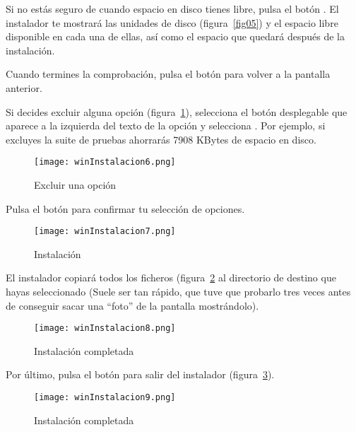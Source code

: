 Si no estás seguro de cuando espacio en disco tienes libre, pulsa el botón . El instalador te mostrará las unidades de disco (figura~\ref{fig05}) y el espacio libre disponible en cada una de ellas, así como el espacio que quedará después de la instalación.

Cuando termines la comprobación, pulsa el botón  para volver a la pantalla anterior.

Si decides excluir alguna opción (figura~\ref{fig06}), selecciona el botón desplegable que aparece a la izquierda del texto de la opción y selecciona . Por ejemplo, si excluyes la suite de pruebas ahorrarás 7908 KBytes de espacio en disco.

\begin{figure}[!h]
  \begin{center}
\texttt{[image: winInstalacion6.png]}
\caption{Excluir una opción}\label{fig06}
  \end{center}
\end{figure}

Pulsa el botón  para confirmar tu selección de opciones.


\begin{figure}[!h]
  \begin{center}
\texttt{[image: winInstalacion7.png]}
\caption{Instalación}\label{fig07}
  \end{center}
\end{figure}

El instalador copiará todos los ficheros (figura~\ref{fig07} al directorio de destino que hayas seleccionado (Suele ser tan rápido, que tuve que probarlo tres veces antes de conseguir sacar una ``foto'' de la pantalla mostrándolo).
 
\begin{figure}[!h]
  \begin{center}
\texttt{[image: winInstalacion8.png]}
\caption{Instalación completada}\label{fig08}
  \end{center}
\end{figure}

Por último, pulsa el botón  para salir del instalador (figura~\ref{fig08}).


\begin{figure}[!h]
  \begin{center}
\texttt{[image: winInstalacion9.png]}
\caption{Instalación completada}\label{fig09}
  \end{center}
\end{figure}

